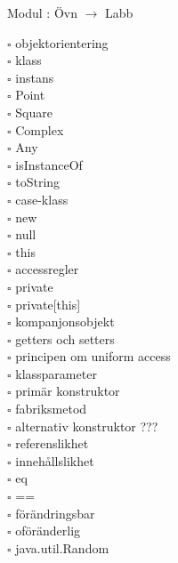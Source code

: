 
    Modul : Övn  $\rightarrow$ Labb 
    \begin{multicols}{3}\SlideFontTiny
    $\square$ objektorientering \\
$\square$ klass \\
$\square$ instans \\
$\square$ Point \\
$\square$ Square \\
$\square$ Complex \\
$\square$ Any \\
$\square$ isInstanceOf \\
$\square$ toString \\
$\square$ case-klass \\
$\square$ new \\
$\square$ null \\
$\square$ this \\
$\square$ accessregler \\
$\square$ private \\
$\square$ private[this] \\
$\square$ kompanjonsobjekt \\
$\square$ getters och setters \\
$\square$ principen om uniform access \\
$\square$ klassparameter \\
$\square$ primär konstruktor \\
$\square$ fabriksmetod \\
$\square$ alternativ konstruktor ??? \\
$\square$ referenslikhet \\
$\square$ innehållslikhet \\
$\square$ eq \\
$\square$ == \\
$\square$ förändringsbar \\
$\square$ oföränderlig \\
$\square$ java.util.Random \\
    \end{multicols}
    
